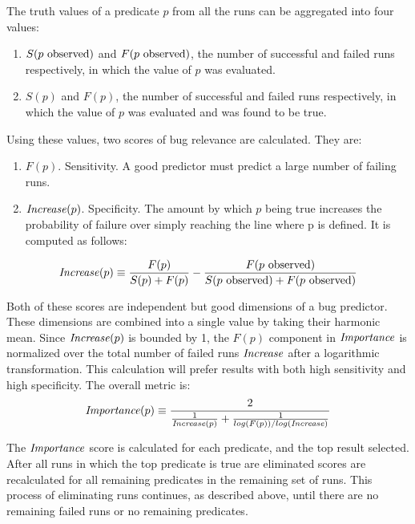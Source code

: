 The truth values of a predicate $p$ from all the runs can be aggregated into four values:

\begin{enumerate}
\item $S(\text{$p$ observed})$ and $F(\text{$p$ observed})$, the number of successful and failed runs respectively, in which the value of $p$ was evaluated.
\item $S(p)$ and $F(p)$, the number of successful and failed runs respectively, in which the value of $p$ was evaluated and was found to be true.
\end{enumerate}

Using these values, two scores of bug relevance are calculated.  They are:
\begin{enumerate}
\item $F(p)$.  Sensitivity.  A good predictor must predict a large number of failing runs.
\item $\mathit{Increase}(p)$.  Specificity.  The amount by which $p$ being true increases the probability of failure over simply reaching the line where p is defined.  It is computed as follows:
\end{enumerate}

\begin{equation}
\label{eqn1}
\mathit{Increase}(p) \equiv
\frac{F(p)}{S(p) + F(p)}
-
\frac{F(\text{$p$ observed})}{S(\text{$p$ observed}) + F(\text{$p$ observed})}
\end{equation}

Both of these scores are independent but good dimensions of a bug predictor.  These dimensions are combined into a single value by taking their harmonic mean.  Since $\mathit{Increase}(p)$ is bounded by 1, the $F(p)$ component in $\mathit{Importance}$ is normalized over the total number of failed runs $\mathit{Increase}$ after a logarithmic transformation.  This calculation will prefer results with both high sensitivity and high specificity.  The overall metric is:
\begin{equation}
\label{eqn2}
\Importance(p) \equiv
\frac{2}{%
  \frac{1}{\Increase(p)}
  +
  \frac{1}{log(F(p)) / log(\NumF)}}
\end{equation}

The $\mathit{Importance}$ score is calculated for each predicate, and the top result selected.  After all runs in which the top predicate is true are eliminated scores are recalculated for all remaining predicates in the remaining set of runs.  This process of eliminating runs continues, as described above, until there are no remaining failed runs or no remaining predicates.

